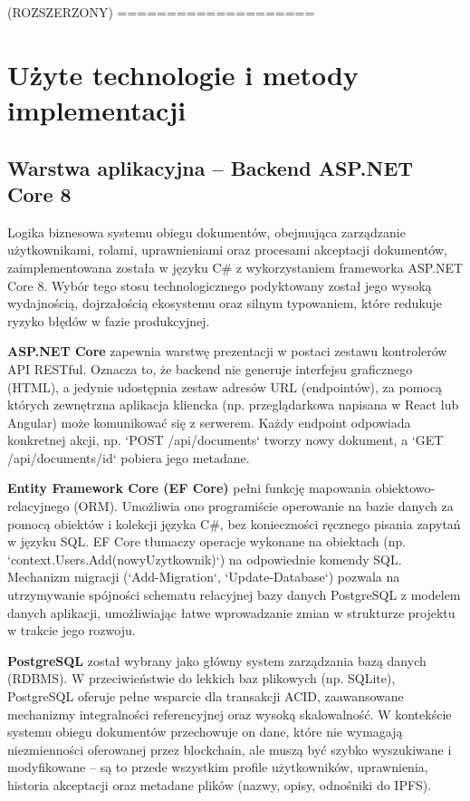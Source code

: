 \documentclass[12pt,a4paper,twoside]{report}
\begin{document}
(ROZSZERZONY) ====================
\chapter{Użyte technologie i metody implementacji}


\section{Warstwa aplikacyjna -- Backend ASP.NET Core 8}

Logika biznesowa systemu obiegu dokumentów, obejmująca zarządzanie użytkownikami, rolami, uprawnieniami oraz procesami akceptacji dokumentów, zaimplementowana została w języku C\# z wykorzystaniem frameworka ASP.NET Core 8. Wybór tego stosu technologicznego podyktowany został jego wysoką wydajnością, dojrzałością ekosystemu oraz silnym typowaniem, które redukuje ryzyko błędów w fazie produkcyjnej.

\textbf{ASP.NET Core} zapewnia warstwę prezentacji w postaci zestawu kontrolerów API RESTful. Oznacza to, że backend nie generuje interfejsu graficznego (HTML), a jedynie udostępnia zestaw adresów URL (endpointów), za pomocą których zewnętrzna aplikacja kliencka (np. przeglądarkowa napisana w React lub Angular) może komunikować się z serwerem. Każdy endpoint odpowiada konkretnej akcji, np. `POST /api/documents` tworzy nowy dokument, a `GET /api/documents/{id}` pobiera jego metadane.


\textbf{Entity Framework Core (EF Core)} pełni funkcję mapowania obiektowo-relacyjnego (ORM). Umożliwia ono programiście operowanie na bazie danych za pomocą obiektów i kolekcji języka C\#, bez konieczności ręcznego pisania zapytań w języku SQL. EF Core tłumaczy operacje wykonane na obiektach (np. `context.Users.Add(nowyUzytkownik)`) na odpowiednie komendy SQL. Mechanizm migracji (`Add-Migration`, `Update-Database`) pozwala na utrzymywanie spójności schematu relacyjnej bazy danych PostgreSQL z modelem danych aplikacji, umożliwiając łatwe wprowadzanie zmian w strukturze projektu w trakcie jego rozwoju.

\textbf{PostgreSQL} został wybrany jako główny system zarządzania bazą danych (RDBMS). W przeciwieństwie do lekkich baz plikowych (np. SQLite), PostgreSQL oferuje pełne wsparcie dla transakcji ACID, zaawansowane mechanizmy integralności referencyjnej oraz wysoką skalowalność. W kontekście systemu obiegu dokumentów przechowuje on dane, które nie wymagają niezmienności oferowanej przez blockchain, ale muszą być szybko wyszukiwane i modyfikowane -- są to przede wszystkim profile użytkowników, uprawnienia, historia akceptacji oraz metadane plików (nazwy, opisy, odnośniki do IPFS).
\end{document}
